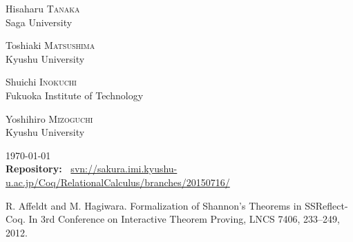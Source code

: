 \documentclass[12pt]{report}
\begin{document}
\begin{titlepage}
\begin{center}
\begin{center}
\begin{minipage}[t]{0.4\textwidth}
\begin{center} 
{\large Hisaharu \textsc{Tanaka}} \\
Saga University
\end{center}
\end{minipage}
\hspace{1cm}
\begin{minipage}[t]{0.4\textwidth}
\begin{center} 
{\large Toshiaki \textsc{Matsushima}} \\
Kyushu University
\end{center}
\end{minipage}
\end{center}
\begin{center}
\begin{minipage}[t]{0.4\textwidth}
\begin{center}
{\large Shuichi \textsc{Inokuchi}} \\
Fukuoka Institute of Technology
\end{center}
\end{minipage}
\hspace{1cm}
\begin{minipage}[t]{0.4\textwidth}
\begin{center} 
{\large Yoshihiro \textsc{Mizoguchi}} \\
Kyushu University
\end{center}
\end{minipage}
\end{center}
\vfill

{\large \today}\\[1cm]
{\footnotesize
{\bf Repository:\ }
\url{svn://sakura.imi.kyushu-u.ac.jp/Coq/RelationalCalculus/branches/20150716/}}
\end{center}
\end{titlepage}

\tableofcontents

\setlength{\headheight}{15pt}
\pagestyle{fancy}
\fancyhead{}
\fancyhead[RE]{\rightmark}
\fancyhead[LO]{\leftmark}
















\begin{thebibliography}{99}
R. Affeldt and M. Hagiwara. Formalization of Shannon’s Theorems in SSReflect-Coq. In 3rd Conference on Interactive Theorem Proving, LNCS 7406, 233--249, 2012.
\end{thebibliography}
\end{document}
